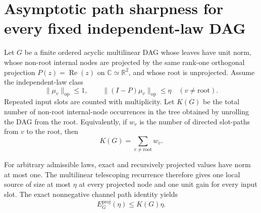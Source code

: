 \section{Asymptotic path sharpness for every fixed independent-law DAG}
\label{sec:dag-asymptotic-sharpness}

Let $G$ be a finite ordered acyclic multilinear DAG whose leaves have unit
norm, whose non-root internal nodes are projected by the same rank-one
orthogonal projection $P(z)=\operatorname{Re}(z)$ on
$\mathbb C\simeq\mathbb R^2$, and whose root is unprojected.  Assume the
independent-law class
\begin{equation*}
 \|\mu_v\|_{\mathrm{op}}\le1,
 \qquad \|(I-P)\mu_v\|_{\mathrm{op}}\le\eta
 \quad(v\ne\mathrm{root}).
\end{equation*}
Repeated input slots are counted with multiplicity.  Let $K(G)$ be the total
number of non-root internal-node occurrences in the tree obtained by
unrolling the DAG from the root. Equivalently, if $w_v$ is the number of
directed slot-paths from $v$ to the root, then
\begin{equation*}
 K(G)=\sum_{v\ne\mathrm{root}}w_v.
\end{equation*}

For arbitrary admissible laws, exact and recursively projected values have norm
at most one.  The multilinear telescoping recurrence therefore gives one local
source of size at most $\eta$ at every projected node and one unit gain for
every input slot.  The exact nonnegative channel path identity yields
\begin{equation*}
 E_G^{\mathrm{proj}}(\eta)\le K(G)\eta.
\end{equation*}

